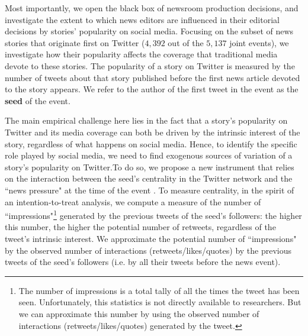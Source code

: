 Most importantly, we open the black box of newsroom production decisions, and investigate the extent to which news editors are influenced in their editorial decisions by stories' popularity on social media. Focusing on the subset of news stories that originate first on Twitter ($4,392$ out of the $5,137$ joint events), we investigate how their popularity affects the coverage that traditional media devote to these stories. The popularity of a story on Twitter is measured by the number of tweets about that story published before the first news article devoted to the story appears. We refer to the author of the first tweet in the event as the \textbf{seed} of the event.

The main empirical challenge here lies in the fact that a story's popularity on Twitter and its media coverage can both be driven by the intrinsic interest of the story, regardless of what happens on social media. Hence, to identify the specific role played by social media, we need to find exogenous sources of variation of a story's popularity on Twitter.To do so, we propose a new instrument that relies on the interaction between the seed's centrality in the Twitter network and the ``news pressure" at the time of the event \citep{EisenseeStromberg2007}. To measure centrality, in the spirit of an intention-to-treat analysis, we compute a measure of the number of ``impressions"\footnote{The number of impressions is a total tally of all the times the tweet has been seen. Unfortunately, this statistics is not directly available to researchers. But we can approximate this number by using the observed number of interactions (retweets/likes/quotes) generated by the tweet.} generated by the previous tweets of the seed's followers: the higher this number, the higher the potential number of retweets, regardless of the tweet's intrinsic interest. We approximate the potential number of ``impressions" by the observed number of interactions (retweets/likes/quotes) by the previous tweets of the seed's followers (i.e. by all their tweets before the news event). 

